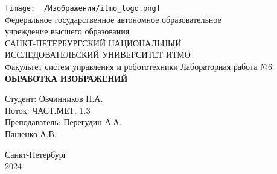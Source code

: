 \documentclass[a4paper]{article}
\begin{document}
\begin{titlepage}
    \begin{center}
    \texttt{[image: ~/Изображения/itmo\_logo.png]}\\[10pt]
        Федеральное государственное автономное образовательное \\ учреждение высшего образования \\[6pt]
        САНКТ-ПЕТЕРБУРГСКИЙ НАЦИОНАЛЬНЫЙ \\ ИССЛЕДОВАТЕЛЬСКИЙ УНИВЕРСИТЕТ ИТМО \\[16pt]
        Факультет систем управления и робототехники \vfill
        Лабораторная работа №6 \\[0.5em]
        \textbf{\MakeUppercase{Обработка изображений}}
    \end{center}\vfill
    \begin{flushright}
        Студент: Овчинников П.А.\\
        Поток: ЧАСТ.МЕТ. 1.3 \\[0.5em]
        Преподаватель: Перегудин А.А.\\Пашенко А.В.
    \end{flushright}\vfill
    \begin{center}
        {\small Санкт-Петербург \\ 2024}
    \end{center}
\end{titlepage}
\setcounter{page}{2}
\tableofcontents\newpage
\end{document}
